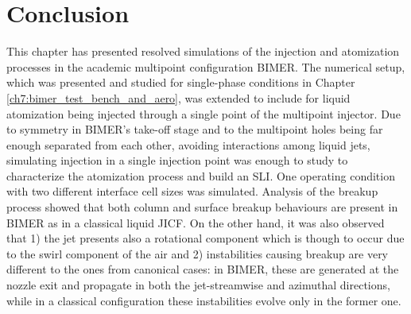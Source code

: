 \section{Conclusion}

This chapter has presented resolved simulations of the injection and atomization processes in the academic multipoint configuration BIMER. The numerical setup, which was presented and studied for single-phase conditions in Chapter \ref{ch7:bimer_test_bench_and_aero}, was extended to include for liquid atomization being injected through a single point of the multipoint injector. Due to symmetry in BIMER's take-off stage and to the multipoint holes being far enough separated from each other, avoiding interactions among liquid jets, simulating injection in a single injection point was enough to study to characterize the atomization process and build an SLI. One operating condition with two different interface cell sizes was simulated. Analysis of the breakup process showed that both column and surface breakup behaviours are present in BIMER as in a classical liquid JICF. On the other hand, it was also observed that 1) the jet presents also a rotational component which is though to occur due to the swirl component of the air and 2) instabilities causing breakup are very different to the ones from canonical cases: in BIMER, these are generated at the nozzle exit and propagate in both the jet-streamwise and azimuthal directions, while in a classical configuration these instabilities evolve only in the former one. 


